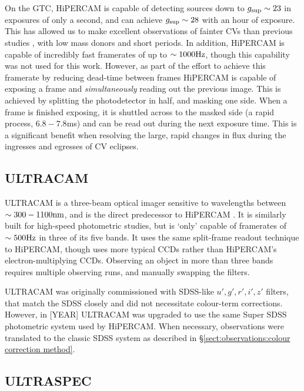 On the GTC, HiPERCAM is capable of detecting sources down to $g_{\rm sup} \sim 23$ in exposures of only a second, and can achieve $g_{\rm sup} \sim 28$ with an hour of exposure. This has allowed us to make excellent observations of fainter CVs than previous studies \citep{McallisterThesis}, with low mass donors and short periods. In addition, HiPERCAM is capable of incredibly fast framerates of up to $\sim 1000 \rm Hz$, though this capability was not used for this work. 
However, as part of the effort to achieve this framerate by reducing dead-time between frames HiPERCAM is capable of exposing a frame and {\it simultaneously} reading out the previous image. 
This is achieved by splitting the photodetector in half, and masking one side. When a frame is finished exposing, it is shuttled across to the masked side (a rapid process, $6.8 - 7.8$ms) and can be read out during the next exposure time. This is a significant benefit when resolving the large, rapid changes in flux during the ingresses and egresses of CV eclipses.


\subsection{ULTRACAM}

ULTRACAM is a three-beam optical imager sensitive to wavelengths between $\sim 300 - 1100 \rm nm$, and is the direct predecessor to HiPERCAM \citep{dhillon2007}. 
It is similarly built for high-speed photometric studies, but is `only' capable of framerates of $\sim 500 \rm Hz$ in three of its five bands. 
It uses the same split-frame readout technique to HiPERCAM, though uses more typical CCDs rather than HiPERCAM's electron-multiplying CCDs. Observing an object in more than three bands requires multiple observing runs, and manually swapping the filters.

ULTRACAM was originally commissioned with SDSS-like $u',g',r',i',z'$ filters, that match the SDSS closely and did not necessitate colour-term corrections. However, in [YEAR]  ULTRACAM was upgraded to use the same Super SDSS photometric system used by HiPERCAM. When necessary, observations were translated to the classic SDSS system as described in \S\ref{sect:observations:colour correction method}. 


\subsection{ULTRASPEC}

